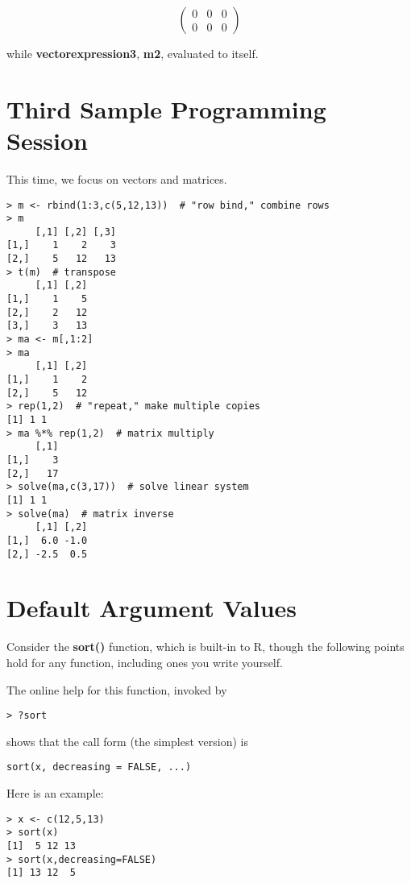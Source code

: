 \begin{equation}
\left (
\begin{array}{rrr}
0 & 0 & 0 \\
0 & 0 & 0
\end{array}
\right )
\end{equation}

while {\bf vectorexpression3}, {\bf m2}, evaluated to itself.

\section{Third Sample Programming Session}

This time, we focus on vectors and matrices.

\begin{lstlisting}
> m <- rbind(1:3,c(5,12,13))  # "row bind," combine rows
> m
     [,1] [,2] [,3]
[1,]    1    2    3
[2,]    5   12   13
> t(m)  # transpose
     [,1] [,2]
[1,]    1    5
[2,]    2   12
[3,]    3   13
> ma <- m[,1:2]
> ma
     [,1] [,2]
[1,]    1    2
[2,]    5   12
> rep(1,2)  # "repeat," make multiple copies
[1] 1 1
> ma %*% rep(1,2)  # matrix multiply
     [,1]
[1,]    3
[2,]   17
> solve(ma,c(3,17))  # solve linear system
[1] 1 1
> solve(ma)  # matrix inverse
     [,1] [,2]
[1,]  6.0 -1.0
[2,] -2.5  0.5
\end{lstlisting}

\section{Default Argument Values}

Consider the {\bf sort()} function, which is built-in to R, though the
following points hold for any function, including ones you write
yourself.

The online help for this function, invoked by

\begin{lstlisting}
> ?sort
\end{lstlisting}

shows that the call form (the simplest version) is

\begin{lstlisting}
sort(x, decreasing = FALSE, ...)
\end{lstlisting}

Here is an example:

\begin{lstlisting}
> x <- c(12,5,13)
> sort(x)
[1]  5 12 13
> sort(x,decreasing=FALSE)
[1] 13 12  5
\end{lstlisting}

